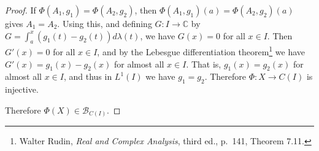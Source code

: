 \documentclass{article}
\theoremstyle{definition}
\theoremstyle{definition}
\begin{document}
\begin{proof}
If $\Phi(A_1,g_1)=\Phi(A_2,g_2)$, then $\Phi(A_1,g_1)(a)=\Phi(A_2,g_2)(a)$ gives $A_1=A_2$. Using this, and defining
$G:I \to \mathbb{C}$ by
$G=\int_a^x (g_1(t)-g_2(t)) d\lambda(t)$, we have
$G(x)=0$   for all $x \in I$. Then $G'(x)=0$ for all $x \in I$, and by the Lebesgue differentiation theorem\footnote{Walter Rudin,
{\em Real and Complex Analysis}, third ed., p.~141, Theorem 7.11.} we have $G'(x)=g_1(x)-g_2(x)$ for almost all $x \in I$. That is,
$g_1(x)=g_2(x)$ for almost all $x \in I$, and thus in $L^1(I)$ we have $g_1=g_2$. 
Therefore $\Phi:X \to C(I)$ is injective. 

Therefore $\Phi(X) \in \mathscr{B}_{C(I)}$.
\end{proof}
\end{document}
